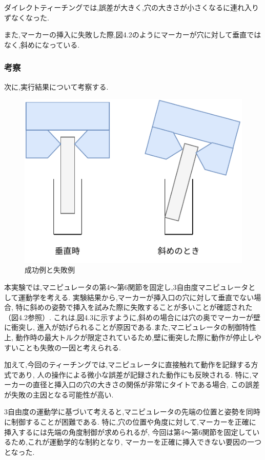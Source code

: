 ダイレクトティーチングでは,誤差が大きく,穴の大きさが小さくなるに連れ入りずなくなった.

また,マーカーの挿入に失敗した際,図4.2のようにマーカーが穴に対して垂直ではなく,斜めになっている.

\newpage

\subsubsection{考察}
次に,実行結果について考察する.

\begin{figure}[h]
  \centering
  \includegraphics[scale=0.8]{sozai/5.pdf}
  \caption{成功例と失敗例}
\end{figure}

本実験では,マニピュレータの第4～第6関節を固定し,3自由度マニピュレータとして運動学を考える.
実験結果から,マーカーが挿入口の穴に対して垂直でない場合,
特に斜めの姿勢で挿入を試みた際に失敗することが多いことが確認された（図4.2参照）.
これは,図4.3に示すように,斜めの場合には穴の奥でマーカーが壁に衝突し,
進入が妨げられることが原因である.また,マニピュレータの制御特性上,
動作時の最大トルクが限定されているため,壁に衝突した際に動作が停止しやすいことも失敗の一因と考えられる.

加えて,今回のティーチングでは,マニピュレータに直接触れて動作を記録する方式であり,
人の操作による微小な誤差が記録された動作にも反映される.
特に,マーカーの直径と挿入口の穴の大きさの関係が非常にタイトである場合,
この誤差が失敗の主因となる可能性が高い.

3自由度の運動学に基づいて考えると,マニピュレータの先端の位置と姿勢を同時に制御することが困難である.
特に,穴の位置や角度に対して,マーカーを正確に挿入するには先端の角度制御が求められるが,
今回は第4～第6関節を固定しているため,これが運動学的な制約となり,
マーカーを正確に挿入できない要因の一つとなった.


